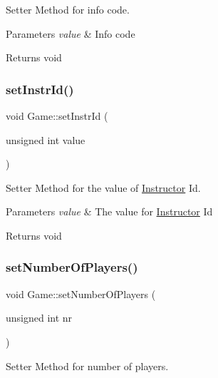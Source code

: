 Setter Method for info code. 


\begin{DoxyParams}{Parameters}
{\em value} & Info code \\
\hline
\end{DoxyParams}
\begin{DoxyReturn}{Returns}
void 
\end{DoxyReturn}
\mbox{\label{classGame_a6548484fe42f375e949b52c96a0bc348}} 
\subsubsection{\texorpdfstring{set\+Instr\+Id()}{setInstrId()}}
{\footnotesize\ttfamily void Game\+::set\+Instr\+Id (\begin{DoxyParamCaption}\item[{unsigned int}]{value }\end{DoxyParamCaption})}



Setter Method for the value of \hyperlink{classInstructor}{Instructor} Id. 


\begin{DoxyParams}{Parameters}
{\em value} & The value for \hyperlink{classInstructor}{Instructor} Id \\
\hline
\end{DoxyParams}
\begin{DoxyReturn}{Returns}
void 
\end{DoxyReturn}
\mbox{\label{classGame_ab3646e6404630076f38d56c1ed36537a}} 
\subsubsection{\texorpdfstring{set\+Number\+Of\+Players()}{setNumberOfPlayers()}}
{\footnotesize\ttfamily void Game\+::set\+Number\+Of\+Players (\begin{DoxyParamCaption}\item[{unsigned int}]{nr }\end{DoxyParamCaption})}



Setter Method for number of players. 


